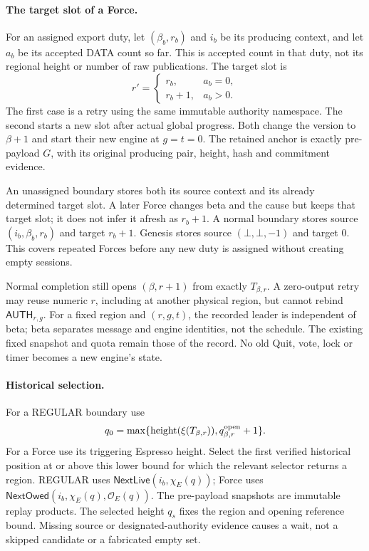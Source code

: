 \documentclass[11pt,a4paper]{article}
\newcommand{\tagg}[1]{\ensuremath{\mathsf{#1}}}
\begin{document}
\paragraph{The target slot of a Force.}
\label{sec:retry-slot}
For an assigned export duty, let $(\beta_b,r_b)$ and $i_b$ be its
producing context, and let $a_b$ be its accepted DATA count so far.
This is accepted count in that duty, not its regional height or number
of raw publications. The target slot is
\[
 r'=
 \begin{cases}
 r_b,&a_b=0,\\
 r_b+1,&a_b>0.
 \end{cases}
\]
The first case is a retry using the same immutable authority namespace.
The second starts a new slot after actual global progress. Both change
the version to $\beta+1$ and start their new engine at $g=t=0$.
The retained anchor is exactly pre-payload $G$, with its original
producing pair, height, hash and commitment evidence.

An unassigned boundary stores both its source context and its already
determined target slot. A later Force changes beta and the cause but
keeps that target slot; it does not infer it afresh as $r_b+1$.
A normal boundary stores source $(i_b,\beta_b,r_b)$ and target $r_b+1$.
Genesis stores source $(\bot,\bot,-1)$ and target 0. This covers repeated
Forces before any new duty is assigned without creating empty sessions.

Normal completion still opens $(\beta,r+1)$ from exactly
$T_{\beta,r}$. A zero-output retry may reuse numeric $r$, including at
another physical region, but cannot rebind $\tagg{AUTH}_{r,g}$.
For a fixed region and $(r,g,t)$, the recorded leader is independent
of beta; beta separates message and engine identities, not the schedule.
The existing fixed snapshot and quota remain those of the record.
No old Quit, vote, lock or timer becomes a new engine's state.

\paragraph{Historical selection.}
For a REGULAR boundary use
\[
 q_0=\max\{\operatorname{height}(\xi(T_{\beta,r})),
                         q^{\rm open}_{\beta,r}+1\}.
\]
For a Force use its triggering Espresso height. Select the first
verified historical position at or above this lower bound for which
the relevant selector returns a region. REGULAR uses
$\tagg{NextLive}(i_b,\chi_E(q))$; Force uses
$\tagg{NextOwed}(i_b,\chi_E(q),\mathcal O_E(q))$.
The pre-payload snapshots are immutable replay products. The selected
height $q_s$ fixes the region and opening reference bound. Missing
source or designated-authority evidence causes a wait, not a skipped
candidate or a fabricated empty set.
\end{document}
